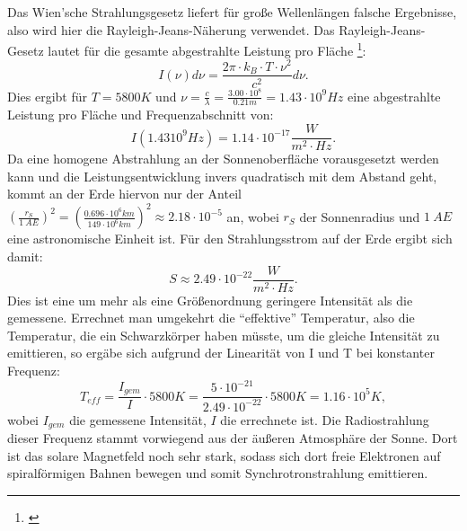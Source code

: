 
Das Wien'sche Strahlungsgesetz liefert für große Wellenlängen falsche Ergebnisse, also wird hier die Rayleigh-Jeans-Näherung verwendet.
Das Rayleigh-Jeans-Gesetz lautet für die gesamte abgestrahlte Leistung pro Fläche \footnote{\cite{Ray}}: 
\begin{equation}
I(\nu) d\nu = \frac{2\pi \cdot k_B \cdot T \cdot \nu^2}{c^2} d\nu. 
\end{equation}
Dies ergibt für $ T = 5800 K$ und $\nu = \frac{c}{\lambda} = \frac{3.00\cdot 10^8}{0.21 m} = 1.43 \cdot 10^9 Hz$ eine abgestrahlte Leistung pro Fläche und Frequenzabschnitt von: 
\begin{equation}
I(1.43 10^{9} Hz) = 1.14 \cdot 10^{-17} \frac{W}{m^2 \cdot Hz}.
\end{equation}
Da eine homogene Abstrahlung an der Sonnenoberfläche vorausgesetzt werden kann und die Leistungsentwicklung invers quadratisch mit dem Abstand geht, kommt an der Erde hiervon nur der Anteil $ (\frac{r_S}{1\ AE})^2 = (\frac{0.696 \cdot 10^{6} km}{149 \cdot 10^6 km})^2 \approx 2.18 \cdot 10^{-5} $ an, wobei $r_S$ der Sonnenradius und $ 1\ AE$ eine astronomische Einheit ist. 
Für den Strahlungsstrom auf der Erde ergibt sich damit: 
\begin{equation}
S \approx 2.49 \cdot 10^{-22} \frac{W}{m^2 \cdot  Hz}.
\end{equation}
Dies ist eine um mehr als eine Größenordnung geringere Intensität als die gemessene. 
Errechnet man umgekehrt die \enquote{effektive} Temperatur, also die Temperatur, die ein Schwarzkörper haben müsste, um die gleiche Intensität zu emittieren, so ergäbe sich aufgrund der Linearität von I und T bei konstanter Frequenz: 
\begin{equation}
T_{eff} = \frac{I_{gem}}{I} \cdot 5800 K = \frac{5 \cdot 10^{-21}}{2.49 \cdot 10^{-22}} \cdot 5800 K = 1.16 \cdot 10^5 K,
\end{equation}
wobei $I_{gem}$ die gemessene Intensität, $I$ die errechnete ist. 
Die Radiostrahlung dieser Frequenz stammt vorwiegend aus der äußeren Atmosphäre der Sonne. Dort ist das solare Magnetfeld noch sehr stark, sodass sich dort freie Elektronen auf spiralförmigen Bahnen bewegen und somit Synchrotronstrahlung emittieren. 

